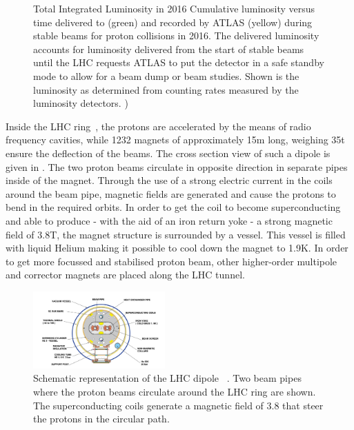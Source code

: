 \begin{figure}[ht]
\begin{minipage}[b]{0.4\textwidth}
	\caption{Total Integrated Luminosity in 2016 
		Cumulative luminosity versus time delivered to (green) and recorded by ATLAS (yellow) during stable beams for proton collisions  in 2016. The delivered luminosity accounts for luminosity delivered from the start of stable beams until the LHC requests ATLAS to put the detector in a safe standby mode to allow for a beam dump or beam studies. Shown is the luminosity as determined from counting rates measured by the luminosity detectors. )}
	\end{minipage}
	\label{fig:IntLumi}
\end{figure}

 
Inside the LHC ring~\cite{Bruning:782076}, the protons are accelerated by the means of radio frequency cavities, while 1232  magnets of approximately 15\si{ \m} long, weighing 35\si{ \tonne} ensure the deflection of the beams. The cross section view of such a dipole is given in . The two proton beams circulate in opposite direction in separate pipes inside of the magnet. Through the use of a strong electric current in the coils around the beam pipe, magnetic fields are generated and cause the protons to bend in the required orbits. In order to get the coil to become superconducting and able to produce - with the aid of an iron return yoke - a strong magnetic field of 3.8\si{ \tesla}, the magnet structure is surrounded by a vessel. This vessel is filled with liquid Helium making it possible to cool down the magnet to 1.9\si{ \kelvin}. In order to get more focussed and stabilised proton beam, other higher-order multipole and corrector magnets are placed along the LHC tunnel.

 \begin{figure}[ht]
	\centering
	\includegraphics[width=0.45\textwidth]{2_ExperimentalSetup/Figures/lhc-pho-1998-341}
	\caption{Schematic representation of the LHC dipole~\cite{Jean-Luc:841539} . Two beam pipes where the proton beams circulate around the LHC ring are shown. The superconducting coils generate a magnetic field of 3.8 \tesla that steer the protons in the circular path. }
	\label{fig:dipole}
\end{figure}




